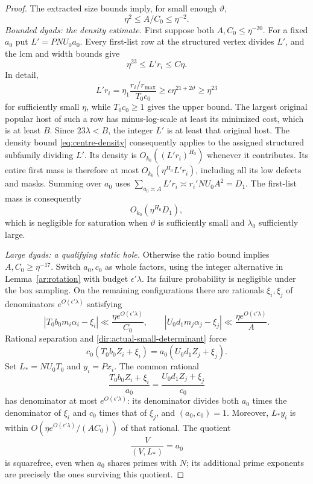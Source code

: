 \begin{proof}
The extracted size bounds imply, for small enough $\vartheta$,
\[
 \eta^2\le A/C_0\le\eta^{-2}.
\]
\emph{Bounded dyads: the density estimate.}
First suppose both $A,C_0\le\eta^{-20}$. For a fixed $a_0$ put
$L'=PNU_0a_0$. Every first-list row at the structured vertex divides
$L'$, and the lcm and width bounds give
\[
 \eta^{23}\le L'r_i\le C\eta.
\]
In detail,
\[
 L'r_i=\eta_1\frac{r_i/r_{\max}}{T_0c_0}
       \ge c\eta^{21+2\vartheta}\ge\eta^{23}
\]
for sufficiently small $\eta$, while $T_0c_0\ge1$ gives the upper
bound.
The largest original popular host of such a row has minus-log-scale
at least its minimized cost, which is at least $B$. Since
$23\lambda<B$, the integer $L'$ is at least that original host.
The density bound \eqref{eq:centre-density} consequently applies to
the assigned structured subfamily dividing $L'$. Its density is
$O_{k_0}((L'r_i)^{H_0})$ whenever it contributes.
Its entire first mass is therefore at most
$O_{k_0}(\eta^{H_0}L'r_i)$, including all its low defects and masks.
Summing over $a_0$ uses
$\sum_{a_0\asymp A}L'r_i\asymp r_i'NU_0A^2=D_1$.
The first-list mass is consequently
\[
 O_{k_0}(\eta^{H_0}D_1),
\]
which is negligible for saturation when $\vartheta$ is sufficiently
small and $\lambda_0$ sufficiently large.

\emph{Large dyads: a qualifying static hole.}
Otherwise the ratio bound implies $A,C_0\ge\eta^{-17}$.
Switch $a_0,c_0$ as whole factors, using the integer alternative in
Lemma~\ref{ar:rotation} with budget $\epsilon'\lambda$. Its failure
probability is negligible
under the box sampling. On the remaining configurations there are
rationals $\xi_i,\xi_j$ of denominators
$e^{O(\epsilon'\lambda)}$ satisfying
\[
 \left|T_0b_0m_i\alpha_i-\xi_i\right|
       \ll\frac{\eta e^{O(\epsilon'\lambda)}}{C_0},
 \qquad
 \left|U_0d_1m_j\alpha_j-\xi_j\right|
       \ll\frac{\eta e^{O(\epsilon'\lambda)}}{A}.
\]
Rational separation and \eqref{dir:actual-small-determinant} force
\begin{equation}\label{dir:common-rational}
 c_0(T_0b_0Z_i+\xi_i)
       =a_0(U_0d_1Z_j+\xi_j).
\end{equation}
Set $L_*=NU_0T_0$ and $y_i=P x_i$. The common rational
\[
 \frac{T_0b_0Z_i+\xi_i}{a_0}
       =\frac{U_0d_1Z_j+\xi_j}{c_0}
\]
has denominator at most $e^{O(\epsilon'\lambda)}$: its denominator
divides both $a_0$ times the denominator of $\xi_i$ and $c_0$ times
that of $\xi_j$, and $(a_0,c_0)=1$. Moreover,
$L_*y_i$ is within
$O(\eta e^{O(\epsilon'\lambda)}/(AC_0))$ of that rational.
The quotient
\[
 \frac{V}{(V,L_*)}=a_0
\]
is squarefree, even when $a_0$ shares primes with $N$; its additional
prime exponents are precisely the ones surviving this quotient.


\end{proof}
